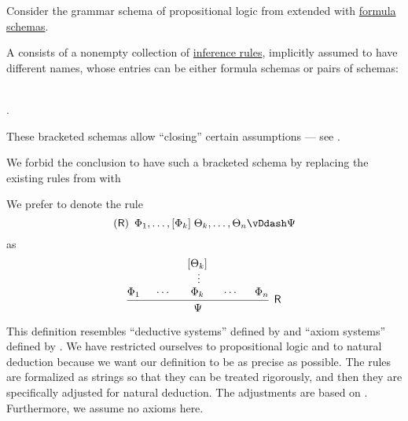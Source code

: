 \begin{definition}\label{def:propositional_natural_deduction_system}\mimprovised
  Consider the grammar schema of propositional logic from  extended with \hyperref[def:propositional_formula_schema]{formula schemas}.

  A  consists of a nonempty collection of \hyperref[def:inference_rule]{inference rules}, implicitly assumed to have different names, whose entries can be either formula schemas or pairs of schemas:
  \begin{bnf*}
     { \bnfor} \\
    .
  \end{bnf*}

  These bracketed schemas allow \enquote{closing} certain assumptions --- see .

  We forbid the conclusion to have such a bracketed schema by replacing the existing rules from  with
  \begin{bnf*}
     {}
  \end{bnf*}

  We prefer to denote the rule
  \begin{equation*}
    (\logic{R}) \enspace \Phi_1, \ldots, [\Phi_k] \thickspace \Theta_k, \ldots, \Theta_n \vDdash \Psi
  \end{equation*}
  as
  \begin{equation*}
    \begin{prooftree}
      \hypo{ \Phi_1 }
      \hypo{ \cdots }
      \hypo{ [\Theta_k] }
      \ellipsis {} { \Phi_k }
      \hypo{ \cdots }
      \hypo{ \Phi_n }
      \infer5[\logic{R}]{ \Psi }
    \end{prooftree}
  \end{equation*}
\end{definition}
\begin{comments}
  \item This definition resembles \enquote{deductive systems} defined by  and \enquote{axiom systems} defined by . We have restricted ourselves to propositional logic and to natural deduction because we want our definition to be as precise as possible. The rules are formalized as strings so that they can be treated rigorously, and then they are specifically adjusted for natural deduction. The adjustments are based on \cite[sec. 2.1]{TroelstraSchwichtenberg2000Proofs}. Furthermore, we assume no axioms here.
\end{comments}

